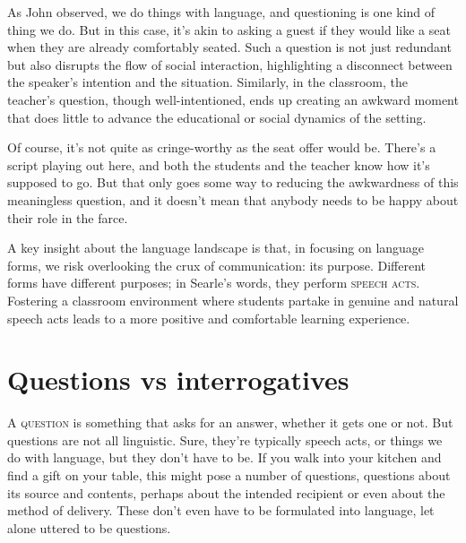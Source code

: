 As John \citet{searle1969} observed, we do things with language, and questioning is one kind of thing we do. But in this case, it's akin to asking a guest if they would like a seat when they are already comfortably seated. Such a question is not just redundant but also disrupts the flow of social interaction, highlighting a disconnect between the speaker's intention and the situation. Similarly, in the classroom, the teacher's question, though well-intentioned, ends up creating an awkward moment that does little to advance the educational or social dynamics of the setting.

Of course, it's not quite as cringe-worthy as the seat offer would be. There's a script playing out here, and both the students and the teacher know how it's supposed to go. But that only goes some way to reducing the awkwardness of this meaningless question, and it doesn't mean that anybody needs to be happy about their role in the farce.

A key insight about the language landscape is that, in focusing on language forms, we risk overlooking the crux of communication: its purpose. Different forms have different purposes; in Searle's words, they perform \textsc{speech acts}. Fostering a classroom environment where students partake in genuine and natural speech acts leads to a more positive and comfortable learning experience.

\section{Questions vs interrogatives}

A \textsc{question} is something that asks for an answer, whether it gets one or not. But questions are not all linguistic. Sure, they're typically speech acts, or things we do with language, but they don't have to be. If you walk into your kitchen and find a gift on your table, this might pose a number of questions, questions about its source and contents, perhaps about the intended recipient or even about the method of delivery. These don't even have to be formulated into language, let alone uttered to be questions.

